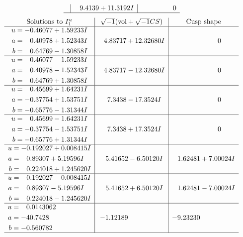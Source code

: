 \documentclass[1p]{elsarticle_modified}
\theoremstyle{definition}
\newcommand{\I}{\sqrt{-1}}
\begin{document}
$$\begin{array}{c|c|c}
 & \phantom{-}9.4139 + 11.3192 I & \phantom{-0.000000 } 0\\
 \hline 
 \end{array}$$\newpage$$\begin{array}{c|c|c}  
\text{Solutions to }I^u_{1}& \I (\text{vol} + \sqrt{-1}CS) & \text{Cusp shape}\\
 \hline 
\begin{aligned}
u &= -0.46077 + 1.59233 I \\
a &= \phantom{-}0.40978 + 1.52343 I \\
b &= \phantom{-}0.64769 - 1.30858 I\end{aligned}
 & \phantom{-}4.83717 + 12.32680 I & \phantom{-0.000000 } 0 \\ \hline\begin{aligned}
u &= -0.46077 - 1.59233 I \\
a &= \phantom{-}0.40978 - 1.52343 I \\
b &= \phantom{-}0.64769 + 1.30858 I\end{aligned}
 & \phantom{-}4.83717 - 12.32680 I & \phantom{-0.000000 } 0 \\ \hline\begin{aligned}
u &= \phantom{-}0.45699 + 1.64231 I \\
a &= -0.37754 + 1.53751 I \\
b &= -0.65776 - 1.31344 I\end{aligned}
 & \phantom{-}7.3438 - 17.3524 I & \phantom{-0.000000 } 0 \\ \hline\begin{aligned}
u &= \phantom{-}0.45699 - 1.64231 I \\
a &= -0.37754 - 1.53751 I \\
b &= -0.65776 + 1.31344 I\end{aligned}
 & \phantom{-}7.3438 + 17.3524 I & \phantom{-0.000000 } 0 \\ \hline\begin{aligned}
u &= -0.192027 + 0.008415 I \\
a &= \phantom{-}0.89307 + 5.19596 I \\
b &= \phantom{-}0.224018 + 1.245620 I\end{aligned}
 & \phantom{-}5.41652 - 6.50120 I & \phantom{-}1.62481 + 7.00024 I \\ \hline\begin{aligned}
u &= -0.192027 - 0.008415 I \\
a &= \phantom{-}0.89307 - 5.19596 I \\
b &= \phantom{-}0.224018 - 1.245620 I\end{aligned}
 & \phantom{-}5.41652 + 6.50120 I & \phantom{-}1.62481 - 7.00024 I \\ \hline\begin{aligned}
u &= \phantom{-}0.0143062\phantom{ +0.000000I} \\
a &= -40.7428\phantom{ +0.000000I} \\
b &= -0.560782\phantom{ +0.000000I}\end{aligned}
 & -1.12189\phantom{ +0.000000I} & -9.23230\phantom{ +0.000000I}\\
 \hline 
 \end{array}$$\newpage\newpage\renewcommand{\arraystretch}{1}
\end{document}
